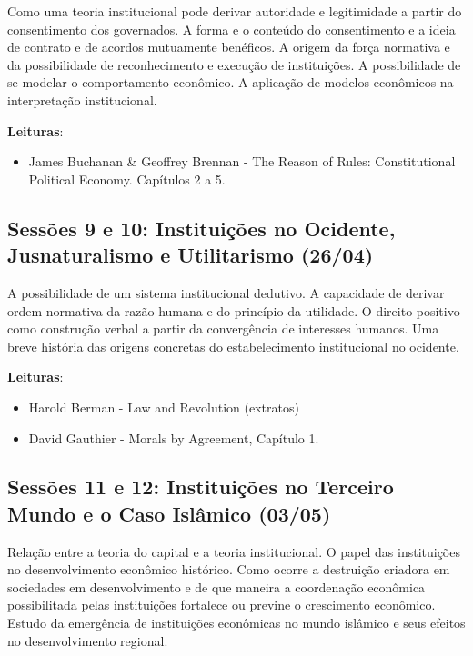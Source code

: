\documentclass[12pt,]{article}
\providecommand{\tightlist}{%
  \setlength{\itemsep}{0pt}\setlength{\parskip}{0pt}}
\begin{document}
Como uma teoria institucional pode derivar autoridade e legitimidade a
partir do consentimento dos governados. A forma e o conteúdo do
consentimento e a ideia de contrato e de acordos mutuamente benéficos. A
origem da força normativa e da possibilidade de reconhecimento e
execução de instituições. A possibilidade de se modelar o comportamento
econômico. A aplicação de modelos econômicos na interpretação
institucional.

\textbf{Leituras}:

\begin{itemize}
\tightlist
\item
  James Buchanan \& Geoffrey Brennan - The Reason of Rules:
  Constitutional Political Economy. Capítulos 2 a 5.
\end{itemize}

\subsection{Sessões 9 e 10: Instituições no Ocidente, Jusnaturalismo e
Utilitarismo
(26/04)}\label{sessoes-9-e-10-instituicoes-no-ocidente-jusnaturalismo-e-utilitarismo-2604}

A possibilidade de um sistema institucional dedutivo. A capacidade de
derivar ordem normativa da razão humana e do princípio da utilidade. O
direito positivo como construção verbal a partir da convergência de
interesses humanos. Uma breve história das origens concretas do
estabelecimento institucional no ocidente.

\textbf{Leituras}:

\begin{itemize}
\tightlist
\item
  Harold Berman - Law and Revolution (extratos)
\item
  David Gauthier - Morals by Agreement, Capítulo 1.
\end{itemize}

\subsection{Sessões 11 e 12: Instituições no Terceiro Mundo e o Caso
Islâmico
(03/05)}\label{sessoes-11-e-12-instituicoes-no-terceiro-mundo-e-o-caso-islamico-0305}

Relação entre a teoria do capital e a teoria institucional. O papel das
instituições no desenvolvimento econômico histórico. Como ocorre a
destruição criadora em sociedades em desenvolvimento e de que maneira a
coordenação econômica possibilitada pelas instituições fortalece ou
previne o crescimento econômico. Estudo da emergência de instituições
econômicas no mundo islâmico e seus efeitos no desenvolvimento regional.
\end{document}
